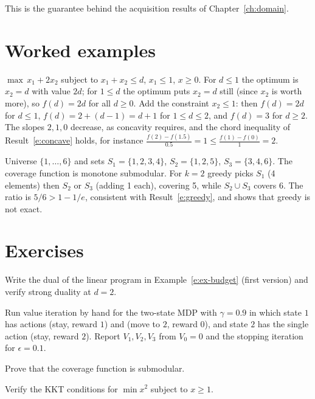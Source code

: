 This is the guarantee behind the acquisition results of Chapter~\ref{ch:domain}.

\section{Worked examples}

\begin{example}\label{e:ex-budget}
$\max\,x_1+2x_2$ subject to $x_1+x_2\le d$, $x_1\le1$, $x\ge0$. For $d\le1$ the optimum is $x_2=d$ with value $2d$; for $1\le d$ the optimum puts $x_2=d$ still (since $x_2$ is worth more), so $f(d)=2d$ for all $d\ge0$. Add the constraint $x_2\le1$: then $f(d)=2d$ for $d\le1$, $f(d)=2+(d-1)=d+1$ for $1\le d\le2$, and $f(d)=3$ for $d\ge2$. The slopes $2,1,0$ decrease, as concavity requires, and the chord inequality of Result~\ref{e:concave} holds, for instance $\frac{f(2)-f(1.5)}{0.5}=1\le\frac{f(1)-f(0)}{1}=2$.
\end{example}

\begin{example}\label{e:ex-greedy}
Universe $\{1,\dots,6\}$ and sets $S_1=\{1,2,3,4\}$, $S_2=\{1,2,5\}$, $S_3=\{3,4,6\}$. The coverage function is monotone submodular. For $k=2$ greedy picks $S_1$ (4 elements) then $S_2$ or $S_3$ (adding 1 each), covering 5, while $S_2\cup S_3$ covers 6. The ratio is $5/6>1-1/e$, consistent with Result~\ref{e:greedy}, and shows that greedy is not exact.
\end{example}

\section*{Exercises}

\begin{exercise}
Write the dual of the linear program in Example~\ref{e:ex-budget} (first version) and verify strong duality at $d=2$.
\end{exercise}
\begin{exercise}
Run value iteration by hand for the two-state MDP with $\gamma=0.9$ in which state $1$ has actions (stay, reward $1$) and (move to $2$, reward $0$), and state $2$ has the single action (stay, reward $2$). Report $V_1,V_2,V_3$ from $V_0=0$ and the stopping iteration for $\epsilon=0.1$.
\end{exercise}
\begin{exercise}
Prove that the coverage function is submodular.
\end{exercise}
\begin{exercise}
Verify the KKT conditions for $\min x^2$ subject to $x\ge1$.
\end{exercise}
